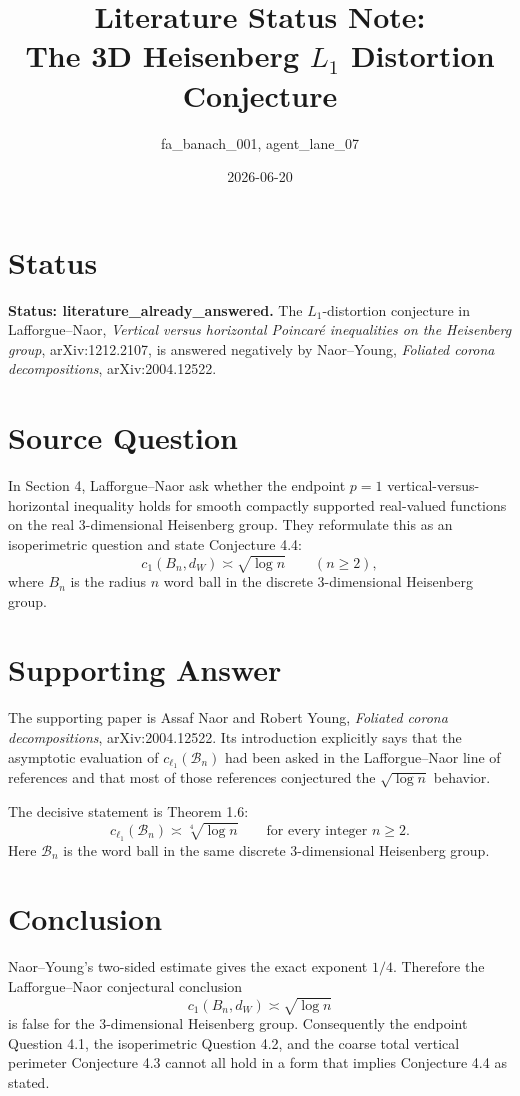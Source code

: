 \documentclass[11pt]{article}
\title{Literature Status Note:\\The 3D Heisenberg \(L_1\) Distortion Conjecture}
\author{fa\_banach\_001, agent\_lane\_07}
\date{2026-06-20}
\begin{document}
\maketitle

\section*{Status}

\textbf{Status: literature\_already\_answered.}
The \(L_1\)-distortion conjecture in Lafforgue--Naor,
\emph{Vertical versus horizontal Poincaré inequalities on the Heisenberg
group}, arXiv:1212.2107, is answered negatively by Naor--Young,
\emph{Foliated corona decompositions}, arXiv:2004.12522.

\section*{Source Question}

In Section 4, Lafforgue--Naor ask whether the endpoint \(p=1\)
vertical-versus-horizontal inequality holds for smooth compactly supported
real-valued functions on the real 3-dimensional Heisenberg group. They
reformulate this as an isoperimetric question and state Conjecture 4.4:
\[
  c_1(B_n,d_W)\asymp \sqrt{\log n}
  \qquad(n\ge 2),
\]
where \(B_n\) is the radius \(n\) word ball in the discrete 3-dimensional
Heisenberg group.

\section*{Supporting Answer}

The supporting paper is Assaf Naor and Robert Young,
\emph{Foliated corona decompositions}, arXiv:2004.12522. Its introduction
explicitly says that the asymptotic evaluation of
\(c_{\ell_1}(\mathcal B_n)\) had been asked in the Lafforgue--Naor line of
references and that most of those references conjectured the
\(\sqrt{\log n}\) behavior.

The decisive statement is Theorem 1.6:
\[
  c_{\ell_1}(\mathcal B_n)\asymp \sqrt[4]{\log n}
  \qquad\text{for every integer } n\ge 2.
\]
Here \(\mathcal B_n\) is the word ball in the same discrete
3-dimensional Heisenberg group.

\section*{Conclusion}

Naor--Young's two-sided estimate gives the exact exponent \(1/4\). Therefore
the Lafforgue--Naor conjectural conclusion
\[
  c_1(B_n,d_W)\asymp \sqrt{\log n}
\]
is false for the 3-dimensional Heisenberg group. Consequently the endpoint
Question 4.1, the isoperimetric Question 4.2, and the coarse total vertical
perimeter Conjecture 4.3 cannot all hold in a form that implies Conjecture 4.4
as stated.
\end{document}
